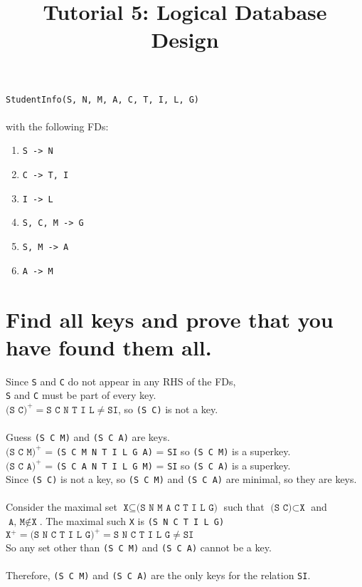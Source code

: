 \documentclass{article}
\title{Tutorial 5: Logical Database Design}
\begin{document}
	\maketitle
	\texttt{StudentInfo(S, N, M, A, C, T, I, L, G)}\\
	\\
	with the following FDs:
	\begin{enumerate}
		\item \texttt{S -> N}
		\item \texttt{C -> T, I}
		\item \texttt{I -> L}
		\item \texttt{S, C, M -> G}
		\item \texttt{S, M -> A}
		\item \texttt{A -> M}
	\end{enumerate}

\section{Find all keys and prove that you have found them all.}

Since \texttt{S} and \texttt{C} do not appear in any RHS of the FDs, \\
\texttt{S} and \texttt{C} must be part of every key. \\
\( \texttt{(S C)}^+ = \texttt{S C N T I L} \neq \texttt{SI} \), so \texttt{(S C)} is not a key.\\
\\
Guess \texttt{(S C M)} and \texttt{(S C A)} are keys. \\
\( \texttt{(S C M)}^+ \) = \texttt{(S C M N T I L G A)} = \texttt{SI} so \texttt{(S C M)} is a superkey.\\
\( \texttt{(S C A)}^+ \) = \texttt{(S C A N T I L G M)} = \texttt{SI} so \texttt{(S C A)} is a superkey.\\
Since \texttt{(S C)} is not a key, so \texttt{(S C M)} and \texttt{(S C A)} are minimal, so they are keys. \\
\\
Consider the maximal set \( \texttt{X}  \subseteq \texttt{(S N M A C T I L G)} \) such that \( \texttt{(S C)} \subset \texttt{X}\) and \( \texttt{A, M} \notin \texttt{X} \). The maximal such \texttt{X} is \texttt{(S N C T I L G)} \\
\( \texttt{X}^+ = \texttt{(S N C T I L G)}^+ = \texttt{S N C T I L G} \neq \texttt{SI} \)\\
So any set other than \texttt{(S C M)} and \texttt{(S C A)} cannot be a key.\\
\\
Therefore, \texttt{(S C M)} and \texttt{(S C A)} are the only keys for the relation \texttt{SI}.\\
\end{document}
